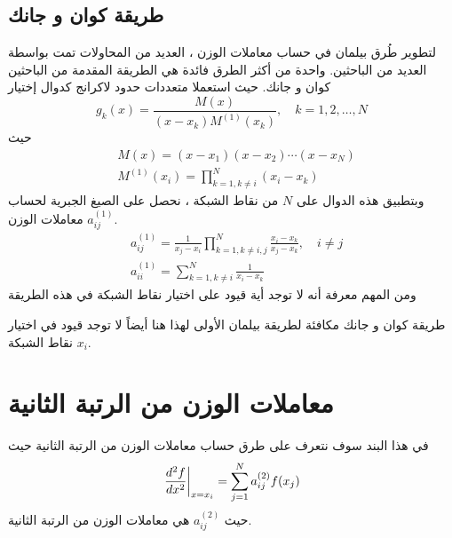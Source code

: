 \subsection[طريقة كوان و جانك]{طريقة كوان و جانك \cite{Quan} }

لتطوير طُرق بيلمان في حساب معاملات الوزن ، العديد من المحاولات تمت بواسطة العديد من الباحثين. واحدة من أكثر الطرق فائدة هي الطريقة المقدمة من الباحثين كوان و جانك. حيث استعملا متعددات حدود لاكرانج كدوال إختيار
\begin{equation}
	\label{test_function_3}
	g_k(x)=\frac{M(x)}{(x-x_k)M^{(1)}(x_k)},\quad k=1,2,\dots,N
\end{equation}
حيث
\begin{align*}
	&M(x)=(x-x_1)(x-x_2)\cdots(x-x_N)\\
	&M^{(1)}(x_i)=\prod_{k=1,k\neq i}^{N}(x_i-x_k)
\end{align*}
وبتطبيق هذه الدوال على $N$ من نقاط الشبكة ، نحصل على الصيغ الجبرية لحساب معاملات الوزن $a_{ij}^{(1)}$.
\begin{equation}
	\label{quan_chang_equations}
	\begin{aligned}
		& a_{ij}^{(1)}=\frac{1}{x_j-x_i}\prod_{k=1,k\neq i,j}^{N}\frac{x_i-x_k}{x_j-x_k},\quad i\neq j \\
		& a_{ii}^{(1)}=\sum_{k=1,k\neq i}^{N}\frac{1}{x_i-x_k}
	\end{aligned}
\end{equation}
ومن المهم معرفة أنه لا توجد أية قيود على اختيار نقاط الشبكة في هذه الطريقة

\begin{note}
	طريقة كوان و جانك مكافئة لطريقة بيلمان الأولى لهذا هنا أيضاً لا توجد قيود في اختيار نقاط الشبكة $x_i$.
\end{note}

\section[معاملات الوزن من الرتبة الثانية]{معاملات الوزن من الرتبة الثانية }

في هذا البند سوف نتعرف على طرق حساب معاملات الوزن من الرتبة الثانية حيث
\begin{equation}
	\label{eq:DQM_formula_order2}
	\left.\frac{d^2f}{dx^2}\right|_{x=x_i}=\sum_{j=1}^{N}a_{ij}^{(2)}f(x_j)
\end{equation}
حيث $a_{ij}^{(2)}$ هي معاملات الوزن من الرتبة الثانية.

